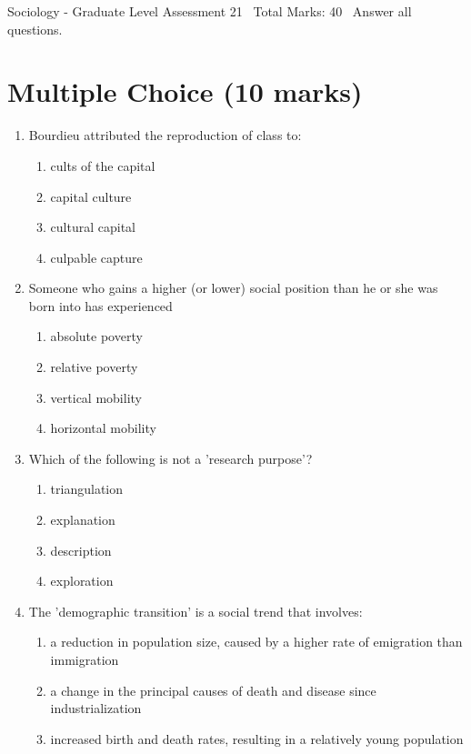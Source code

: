 \documentclass[12pt]{article}
\begin{document}
\begin{center}
Sociology - Graduate Level Assessment 21 \
Total Marks: 40 \
Answer all questions.
\end{center}

\section*{Multiple Choice (10 marks)}
\begin{enumerate}[label=\arabic*.]
\item Bourdieu attributed the reproduction of class to:
\begin{enumerate}[label=(\alph*)]
    \item cults of the capital
    \item capital culture
    \item cultural capital
    \item culpable capture
\end{enumerate}
\item Someone who gains a higher (or lower) social position than he or she was born into has experienced
\begin{enumerate}[label=(\alph*)]
    \item absolute poverty
    \item relative poverty
    \item vertical mobility
    \item horizontal mobility
\end{enumerate}
\item Which of the following is not a 'research purpose'?
\begin{enumerate}[label=(\alph*)]
    \item triangulation
    \item explanation
    \item description
    \item exploration
\end{enumerate}
\item The 'demographic transition' is a social trend that involves:
\begin{enumerate}[label=(\alph*)]
    \item a reduction in population size, caused by a higher rate of emigration than immigration
    \item a change in the principal causes of death and disease since industrialization
    \item increased birth and death rates, resulting in a relatively young population

\end{enumerate}
\end{enumerate}
\end{document}
